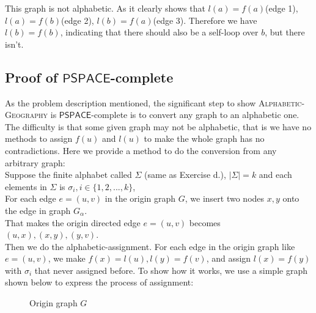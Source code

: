 This graph is not alphabetic.
As it clearly shows that $l(a) = f(a)$(edge 1), $l(a) = f(b)$(edge 2), $l(b) = f(a)$(edge 3).
Therefore we have $l(b) = f(b)$, indicating that there should also be a self-loop over $b$, but there isn't.

\subsection*{Proof of $\mathsf{PSPACE}$-complete}
As the problem description mentioned, the significant step to show \textsc{Alphabetic-Geography} is $\mathsf{PSPACE}$-complete is to convert any graph to an alphabetic one. The difficulty is that some given graph may not be alphabetic, that is we have no methods to assign $f(u)$ and $l(u)$ to make the whole graph has no contradictions. Here we provide a method to do the conversion from any arbitrary graph:\\
Suppose the finite alphabet called $\Sigma$ (same as Exercise d.), $|\Sigma|=k$ and each elements in $\Sigma$ is $\sigma_i, i\in \{1,2,...,k\}$,\\
\color{red} For each edge $e=(u,v)$ in the origin graph $G$, we insert two nodes $x,y$ onto the edge in graph $G_\alpha$.\color{black}\\
That makes the origin directed edge $e=(u,v)$ becomes $(u,x),(x,y),(y,v)$. \\
Then we do the alphabetic-assignment. For each edge in the origin graph like $e=(u,v)$, we make $f(x)=l(u), l(y)=f(v)$, and assign $l(x)=f(y)$ with $\sigma_i$ that never assigned before. To show how it works, we use a simple graph shown below to express the process of assignment:
\begin{figure}[h]
    \centering
    \caption{Origin graph $G$}
\end{figure}

